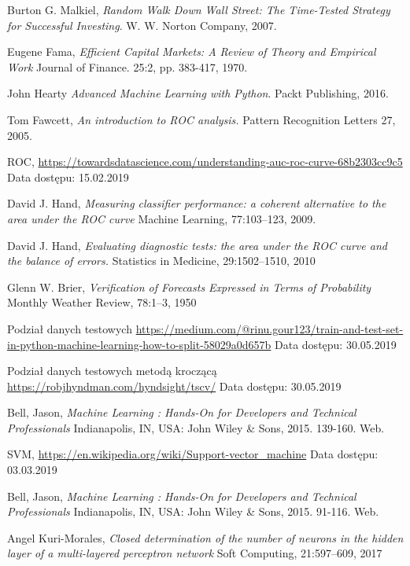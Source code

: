 \documentclass[a4paper, twoside, 11pt, openright]{article}
\begin{document}
\begin{thebibliography}{9}
  Burton G. Malkiel,
  \textit{Random Walk Down Wall Street: The Time-Tested Strategy for Successful Investing}.
  W. W. Norton Company,
  2007.

  Eugene Fama,
  \textit{Efficient Capital Markets: A Review of Theory and Empirical Work}
  Journal of Finance. 25:2, pp. 383-417, 1970.

  John Hearty
  \textit{Advanced Machine Learning with Python}.
  Packt Publishing,
  2016.

	Tom Fawcett, 
  \textit{An introduction to ROC analysis.}
  Pattern Recognition Letters 27,
  2005.

	ROC, \url{https://towardsdatascience.com/understanding-auc-roc-curve-68b2303cc9c5} 
	Data dostępu: 15.02.2019

	David J. Hand, 
  \textit{Measuring classifier performance: a coherent alternative to the area under the ROC curve}
  Machine Learning, 77:103–123, 2009.

	David J. Hand, 
  \textit{Evaluating diagnostic tests: the area under the ROC curve and the balance of errors.}
 Statistics in Medicine, 29:1502–1510, 2010

	Glenn W. Brier, 
  \textit{Verification of Forecasts Expressed in Terms of Probability}
  Monthly Weather Review, 78:1–3, 1950

 Podział danych testowych \url{https://medium.com/@rinu.gour123/train-and-test-set-in-python-machine-learning-how-to-split-58029a0d657b}
 Data dostępu: 30.05.2019
 
 
 Podział danych testowych metodą kroczącą \url{https://robjhyndman.com/hyndsight/tscv/}
 Data dostępu: 30.05.2019
 
	Bell, Jason, \textit{Machine Learning : Hands-On for Developers and Technical Professionals}  Indianapolis, IN, USA: John Wiley \& Sons, 2015. 139-160. Web.
	
	SVM, \url{https://en.wikipedia.org/wiki/Support-vector_machine} 
	Data dostępu: 03.03.2019

	Bell, Jason, \textit{Machine Learning : Hands-On for Developers and Technical Professionals}  Indianapolis, IN, USA: John Wiley \& Sons, 2015. 91-116. Web.


	Angel Kuri-Morales, 
  \textit{Closed determination of the number of neurons in the hidden layer of a multi-layered perceptron network}
  Soft Computing, 21:597–609, 2017


\end{thebibliography}
\end{document}
